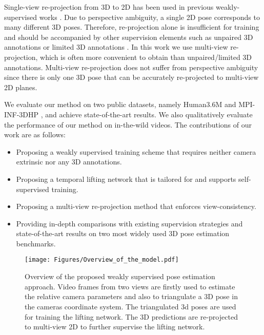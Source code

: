 \documentclass[10pt,twocolumn,letterpaper]{article}
\begin{document}
Single-view re-projection from 3D to 2D has been used in previous weakly-supervised works \cite{Kanazawa_2018_CVPR, Wandt_2019_CVPR}. Due to perspective ambiguity, a single 2D pose corresponds to many different 3D poses. Therefore, re-projection alone is insufficient for training and should be accompanied by other supervision elements such as unpaired 3D annotations \cite{Wandt_2019_CVPR} or limited 3D annotations \cite{Pavllo_2019_CVPR}. In this work we use multi-view re-projection, which is often more convenient to obtain than unpaired/limited 3D annotations. Multi-view re-projection does not suffer from perspective ambiguity since there is only one 3D pose that can be accurately re-projected to multi-view 2D planes.

We evaluate our method on two public datasets, namely Human3.6M \cite{h36m_pami} and MPI-INF-3DHP \cite{mehta2017monocular}, and achieve state-of-the-art results. We also qualitatively evaluate the performance of our method on in-the-wild videos. The contributions of our work are as follows:
\begin{spacing}{0.5}
\begin{itemize} 
\item  Proposing a weakly supervised training scheme that requires neither camera extrinsic nor any 3D annotations.
\item  Proposing a temporal lifting network that is tailored for and supports self-supervised training.
\item  Proposing a multi-view re-projection method that enforces view-consistency.
\item  Providing in-depth comparisons with existing supervision strategies and state-of-the-art results on two most widely used 3D pose estimation benchmarks.
\end{itemize}
\end{spacing}

\begin{figure*}[t]
\begin{center}
\texttt{[image: Figures/Overview\_of\_the\_model.pdf]}
\end{center}
  \caption{Overview of the proposed weakly supervised pose estimation approach. Video frames from two views are firstly used to estimate the relative camera parameters and also to triangulate a 3D pose in the cameras coordinate system. The triangulated 3d poses are used for training the lifting network. The 3D predictions are re-projected to multi-view 2D to further supervise the lifting network.}
\label{fig:overview}
\end{figure*}
\end{document}
